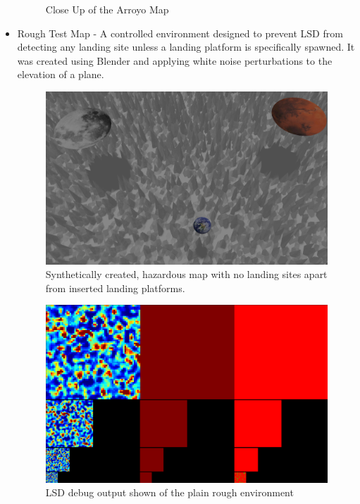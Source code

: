 \begin{itemize}
\begin{figure}[h]
        \caption{Close Up of the Arroyo Map}
        \label{fig:sim_view_arroyo}
    \end{figure}
    \item Rough Test Map - A controlled environment designed to prevent LSD from detecting any landing site unless a landing platform is specifically spawned. It was created using Blender and applying white noise perturbations to the elevation of a plane. 
    \begin{figure}[h]
        \centering
        \includegraphics[scale=0.27]{images/evaluation/rough_test_map.png}
        \caption{Synthetically created, hazardous map with no landing sites apart from inserted landing platforms.}
    \end{figure}
    \begin{figure}[h]
        \centering
        \includegraphics[scale=0.25]{images/evaluation/rough_map_LSD.png}
        \caption{LSD debug output shown of the plain rough environment}
    \end{figure}

\end{itemize}
